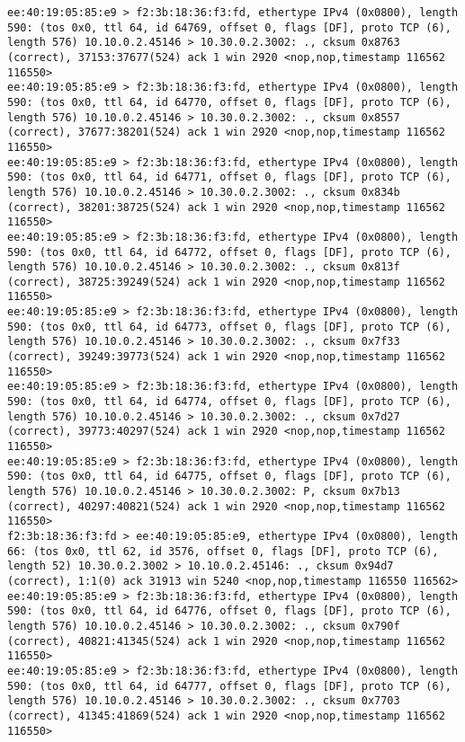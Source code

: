 \documentclass[a4paper,12pt]{article}
\begin{document}
\begin{Verbatim}
ee:40:19:05:85:e9 > f2:3b:18:36:f3:fd, ethertype IPv4 (0x0800), length 590: (tos 0x0, ttl 64, id 64769, offset 0, flags [DF], proto TCP (6), length 576) 10.10.0.2.45146 > 10.30.0.2.3002: ., cksum 0x8763 (correct), 37153:37677(524) ack 1 win 2920 <nop,nop,timestamp 116562 116550>
ee:40:19:05:85:e9 > f2:3b:18:36:f3:fd, ethertype IPv4 (0x0800), length 590: (tos 0x0, ttl 64, id 64770, offset 0, flags [DF], proto TCP (6), length 576) 10.10.0.2.45146 > 10.30.0.2.3002: ., cksum 0x8557 (correct), 37677:38201(524) ack 1 win 2920 <nop,nop,timestamp 116562 116550>
ee:40:19:05:85:e9 > f2:3b:18:36:f3:fd, ethertype IPv4 (0x0800), length 590: (tos 0x0, ttl 64, id 64771, offset 0, flags [DF], proto TCP (6), length 576) 10.10.0.2.45146 > 10.30.0.2.3002: ., cksum 0x834b (correct), 38201:38725(524) ack 1 win 2920 <nop,nop,timestamp 116562 116550>
ee:40:19:05:85:e9 > f2:3b:18:36:f3:fd, ethertype IPv4 (0x0800), length 590: (tos 0x0, ttl 64, id 64772, offset 0, flags [DF], proto TCP (6), length 576) 10.10.0.2.45146 > 10.30.0.2.3002: ., cksum 0x813f (correct), 38725:39249(524) ack 1 win 2920 <nop,nop,timestamp 116562 116550>
ee:40:19:05:85:e9 > f2:3b:18:36:f3:fd, ethertype IPv4 (0x0800), length 590: (tos 0x0, ttl 64, id 64773, offset 0, flags [DF], proto TCP (6), length 576) 10.10.0.2.45146 > 10.30.0.2.3002: ., cksum 0x7f33 (correct), 39249:39773(524) ack 1 win 2920 <nop,nop,timestamp 116562 116550>
ee:40:19:05:85:e9 > f2:3b:18:36:f3:fd, ethertype IPv4 (0x0800), length 590: (tos 0x0, ttl 64, id 64774, offset 0, flags [DF], proto TCP (6), length 576) 10.10.0.2.45146 > 10.30.0.2.3002: ., cksum 0x7d27 (correct), 39773:40297(524) ack 1 win 2920 <nop,nop,timestamp 116562 116550>
ee:40:19:05:85:e9 > f2:3b:18:36:f3:fd, ethertype IPv4 (0x0800), length 590: (tos 0x0, ttl 64, id 64775, offset 0, flags [DF], proto TCP (6), length 576) 10.10.0.2.45146 > 10.30.0.2.3002: P, cksum 0x7b13 (correct), 40297:40821(524) ack 1 win 2920 <nop,nop,timestamp 116562 116550>
f2:3b:18:36:f3:fd > ee:40:19:05:85:e9, ethertype IPv4 (0x0800), length 66: (tos 0x0, ttl 62, id 3576, offset 0, flags [DF], proto TCP (6), length 52) 10.30.0.2.3002 > 10.10.0.2.45146: ., cksum 0x94d7 (correct), 1:1(0) ack 31913 win 5240 <nop,nop,timestamp 116550 116562>
ee:40:19:05:85:e9 > f2:3b:18:36:f3:fd, ethertype IPv4 (0x0800), length 590: (tos 0x0, ttl 64, id 64776, offset 0, flags [DF], proto TCP (6), length 576) 10.10.0.2.45146 > 10.30.0.2.3002: ., cksum 0x790f (correct), 40821:41345(524) ack 1 win 2920 <nop,nop,timestamp 116562 116550>
ee:40:19:05:85:e9 > f2:3b:18:36:f3:fd, ethertype IPv4 (0x0800), length 590: (tos 0x0, ttl 64, id 64777, offset 0, flags [DF], proto TCP (6), length 576) 10.10.0.2.45146 > 10.30.0.2.3002: ., cksum 0x7703 (correct), 41345:41869(524) ack 1 win 2920 <nop,nop,timestamp 116562 116550>

\end{Verbatim}
\end{document}
